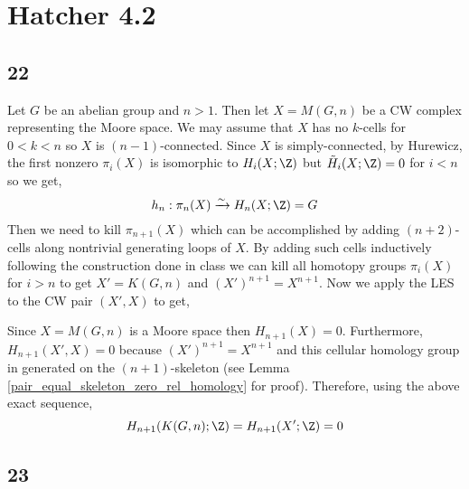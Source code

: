 \documentclass[12pt]{extarticle}
\begin{document}

\section*{Hatcher 4.2}

\subsection{22}

Let $G$ be an abelian group and $n > 1$. Then let $X = M(G, n)$ be a CW complex representing the Moore space. We may assume that $X$ has no $k$-cells for $0 < k < n$ so $X$ is $(n-1)$-connected. Since $X$ is simply-connected, by Hurewicz, the first nonzero $\pi_i(X)$ is isomorphic to $H_i(X; \Z)$ but $\tilde{H}_i(X; \Z) = 0$ for $i < n$ so we get,
\[ h_n : \pi_n(X) \xrightarrow{\sim} H_n(X; \Z) = G \]
Then we need to kill $\pi_{n+1}(X)$ which can be accomplished by adding $(n+2)$-cells along nontrivial generating loops of $X$. By adding such cells inductively following the construction done in class we can kill all homotopy groups $\pi_i(X)$ for $i > n$ to get $X' = K(G, n)$ and $(X')^{n+1} = X^{n+1}$. Now we apply the LES to the CW pair $(X', X)$ to get,
\begin{center}
\end{center} 
Since $X = M(G, n)$ is a Moore space then $H_{n+1}(X) = 0$. Furthermore, $H_{n+1}(X', X) = 0$ because $(X')^{n+1} = X^{n+1}$ and this cellular homology group in generated on the $(n+1)$-skeleton (see Lemma \ref{pair_equal_skeleton_zero_rel_homology} for proof). Therefore, using the above exact sequence,
\[ H_{n+1}(K(G, n) ; \Z) = H_{n+1}(X' ; \Z) = 0 \]
\iffalse
Alternatively, we may apply the Hurewicz theorem to $K(G, n)$ as follows. Since $K(G, n)$ is a $(n-1)$-connected CW complex then $h_{n+1} : \pi_{n+1}(K(G, n)) \onto H_{n+1}(K(G, n); \Z)$ but $\pi_{n+1}(K(G, n)) = 0$ so $H_{n+1}(K(G, n); \Z) = 0$. 
\fi
\subsection{23}
\end{document}
